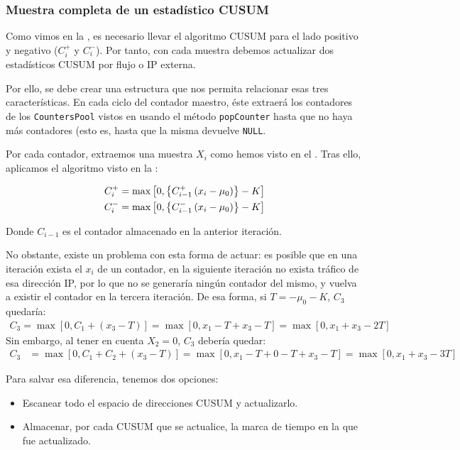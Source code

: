 \subsubsection{Muestra completa de un estadístico CUSUM}
Como vimos en la , es necesario llevar el algoritmo CUSUM para el lado positivo y negativo ($C_i^+$ 
y $C_i^-$). Por tanto, con cada muestra debemos actualizar dos estadísticos \gls{CUSUM} por flujo o \gls{IP} externa.

Por ello, se debe crear una estructura que nos permita relacionar esas tres características. En cada ciclo del contador 
maestro, éste extraerá los contadores de los \texttt{CountersPool} vistos en  usando el 
método \texttt{popCounter} hasta que no haya más contadores (esto es, hasta que la misma devuelve \texttt{NULL}.

Por cada contador, extraemos una muestra $X_i$ como hemos visto en el . Tras ello, 
aplicamos el algoritmo visto en la :

\begin{align}
 C_i^+ &= \max \left[0,\left\{C_{i-1}^+\left(x_i-\mu_0\right)\right\}-K\right] \LABEQ{CUSUMPositivo}\\
 C_i^- &= \max \left[0,\left\{C_{i-1}^-\left(x_i-\mu_0\right)\right\}-K\right] \LABEQ{CUSUMNegativo}
\end{align}

Donde $C_{i-1}$ es el contador almacenado en la anterior iteración.

No obstante, existe un problema con esta forma de actuar: es posible que en una iteración exista el $x_i$ de un 
contador, en la siguiente iteración no exista tráfico de esa dirección \gls{IP}, por lo que no se generaría ningún 
contador del mismo, y vuelva a existir el contador en la tercera iteración. De esa forma, si $T=-\mu_0-K$, $C_3$ 
quedaría:
\begin{align}
 C_3 = \max\left[0,C_1 + (x_3-T)\right] = \max\left[0,x_1-T+x_3-T\right] = 
       \max\left[0,x_1+x_3-2T\right] 
\end{align}
Sin embargo, al tener en cuenta $X_2=0$, $C_3$ debería quedar:
\begin{align}
 C_3 &= \max\left[0,C_1 + C_2 + (x_3-T)\right] = \max\left[0,x_1-T+0-T+x_3-T\right]
     =        \max\left[0,x_1 + x_3 -3T\right] 
\end{align}

Para salvar esa diferencia, tenemos dos opciones:
\begin{itemize}
 \item Escanear todo el espacio de direcciones CUSUM y actualizarlo.
 \item Almacenar, por cada CUSUM que se actualice, la marca de tiempo en la que fue actualizado.
\end{itemize}

